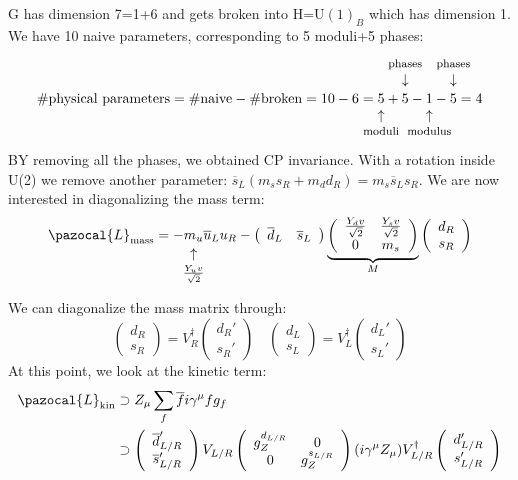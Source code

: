 \documentclass[../main.tex]{subfiles}
\begin{document}
G has dimension 7=1+6 and gets broken into H=U$(1)_B$ which has dimension 1. We have 10 naive parameters, corresponding to 5 moduli+5 phases:
\[
\text{\#physical parameters}=\text{\#naive}-\text{\#broken}=10-6=\underset{\mathclap{\tikz \node {$\uparrow$} node [below=1ex] {\footnotesize moduli };}}{5}+\overset{\mathclap{\tikz \node {$\downarrow$} node [above=1ex] {\footnotesize  phases};}}{5}-\underset{\mathclap{\tikz \node {$\uparrow$} node [below=1ex] {\footnotesize modulus};}}{1}-\overset{\mathclap{\tikz \node {$\downarrow$} node [above=1ex] {\footnotesize phases };}}{5}=4
\]
BY removing all the phases, we obtained CP invariance. With a rotation inside U(2) we remove another parameter: $\overline{s}_L(m_ss_R+m_dd_R)=m_s\overline{s}_Ls_R$. We are now interested in diagonalizing the mass term:
\[
\pazocal{L}_{\text{mass}}=-\underset{\mathclap{\tikz \node {$\uparrow$} node [below=1ex] {\footnotesize  $\frac{Y_uv}{\sqrt{2}}$};}}{m_u}\overline{u}_Lu_R-\left(\begin{array}{cc}
    \overline{d}_L & \overline{s}_L
\end{array}\right)
\underbrace{\left(\begin{array}{cc}
    \frac{Y_dv}{\sqrt{2}} & \frac{Y_sv}{\sqrt{2}} \\
    0 & m_s
\end{array}\right)}_{M}
\left(\begin{array}{c}
    d_R\\
    s_R
\end{array}\right)
\]
We can diagonalize the mass matrix through:
\[
\left(\begin{array}{c}
     d_R\\
     s_R
\end{array}\right)=V_R^\dagger\left(\begin{array}{c}
     d_R'\\
     s_R'
\end{array}\right)
\quad
\left(\begin{array}{c}
     d_L\\
     s_L
\end{array}\right)=V_L^\dagger\left(\begin{array}{c}
     d_L'\\
     s_L'
\end{array}\right)
\]
At this point, we look at the kinetic term:
\begin{align*}
\pazocal{L}_{\text{kin}}&\supset Z_\mu\sum_f\overline{f}i\gamma^\mu fg_f\\
&\supset\left(\begin{array}{c}
    \overline{d}_{L/R}' \\ \overline{s}_{L/R}'
\end{array}\right)V_{L/R}
\left(\begin{array}{cc}
    g_Z^{d_{L/R}} & 0 \\
    0 & g_Z^{s_{L/R}}
\end{array}\right)(i\gamma^\mu Z_\mu)V_{L/R}^\dagger
\left(\begin{array}{c}
    d_{L/R}' \\
    s_{L/R}' 
\end{array}\right)
\end{align*}
\end{document}
